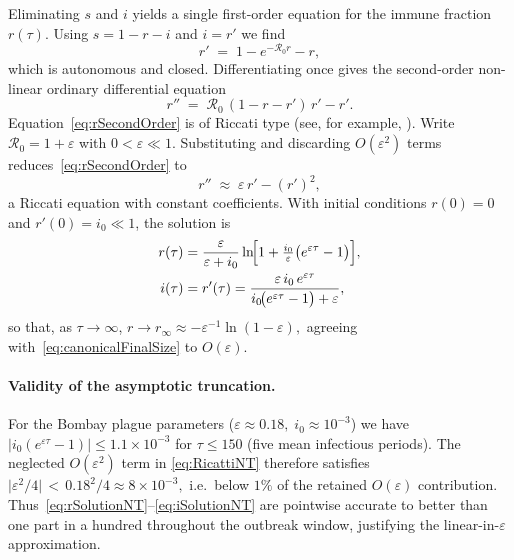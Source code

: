 \documentclass[11pt]{article}
\newcommand{\RR}{\mathcal{R}_0}
\begin{document}
Eliminating $s$ and $i$ yields a single first-order equation for
the immune fraction \(r(\tau)\).  Using
\(s = 1 - r - i\) and \(i = r'\) we find
\begin{equation}\label{eq:rFirstOrder}
  r' \;=\; 1 - e^{-\RR r} - r,
\end{equation}
which is autonomous and closed.  Differentiating once gives the
second-order non-linear ordinary differential equation
\begin{equation}\label{eq:rSecondOrder}
  r'' \;=\; \RR\,(1 - r - r')\,r' - r'.
\end{equation}
Equation~\eqref{eq:rSecondOrder} is of Riccati type
(see, for example, \citet[§1.2]{Polyanin2002}).  Write
\(\RR = 1+\varepsilon\) with \(0<\varepsilon\ll1\).
Substituting and discarding $O(\varepsilon^{2})$ terms
reduces~\eqref{eq:rSecondOrder} to
\begin{equation}\label{eq:RicattiNT}
  r'' \;\approx\; \varepsilon\,r' - (r')^{2},
\end{equation}
a Riccati equation with constant coefficients.
With initial conditions $r(0)=0$ and \(r'(0)=i_0\ll1\),
the solution is
\begin{align}
r(\tau) &=
  \frac{\varepsilon}{\varepsilon+i_0}
  \ln\!\Bigl[1+\tfrac{i_0}{\varepsilon}\bigl(e^{\varepsilon\tau}-1\bigr)\Bigr],
\label{eq:rSolutionNT}\\
i(\tau)&=r'(\tau)=
  \frac{\varepsilon\,i_0\,e^{\varepsilon\tau}}
       {i_0\!\bigl(e^{\varepsilon\tau}-1\bigr)+\varepsilon},
\label{eq:iSolutionNT}
\end{align}
so that, as \(\tau\to\infty\),
\(
r\to r_\infty \approx -\varepsilon^{-1}\ln(1-\varepsilon),
\)
agreeing with~\cref{eq:canonicalFinalSize} to $O(\varepsilon)$.

\paragraph{Validity of the asymptotic truncation.}
For the Bombay plague parameters
(\(\varepsilon\approx0.18,\; i_0\approx10^{-3}\))
we have
\(
|i_0(e^{\varepsilon\tau}-1)|\le1.1\times10^{-3}
\)
for $\tau\le150$ (five mean infectious periods).
The neglected $O(\varepsilon^{2})$ term in
\eqref{eq:RicattiNT} therefore satisfies
\(
\bigl| \varepsilon^{2}/4 \bigr| \,<\, 0.18^{2}/4 \approx 8\times10^{-3},
\)
i.e.\ below $1\%$ of the retained $O(\varepsilon)$ contribution.
Thus~\eqref{eq:rSolutionNT}–\eqref{eq:iSolutionNT} are pointwise
accurate to better than one part in a hundred throughout the outbreak
window, justifying the linear-in-$\varepsilon$ approximation.
\end{document}
